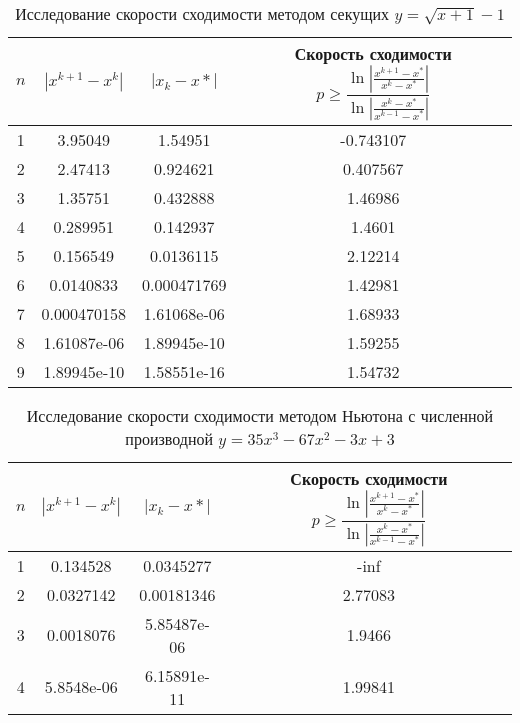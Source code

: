 \documentclass{article}
\begin{document}
    \begin{table}[H]
        \centering
        \caption{Исследование скорости сходимости методом секущих \mbox{$y = \sqrt{x+1} - 1$}}
        \begin{tabular}{|c|c|c|c|}
            \hline
            $n$ & $|x^{k+1} - x^k|$ & $ |x_k - x*|$ & Скорость сходимости $p \geqslant \dfrac{\ln | \frac{x^{k+1}-x^*}{x^k - x^*} |}{\ln |\frac{x^k -x^*}{x^{k-1} - x^*}|}$ \\
            \hline 
            1 & 3.95049 & 1.54951 & -0.743107 \\ \hline
            2 & 2.47413 & 0.924621 & 0.407567 \\ \hline
            3 & 1.35751 & 0.432888 & 1.46986 \\ \hline
            4 & 0.289951 & 0.142937 & 1.4601 \\ \hline
            5 & 0.156549 & 0.0136115 & 2.12214 \\ \hline
            6 & 0.0140833 & 0.000471769 & 1.42981 \\ \hline
            7 & 0.000470158 & 1.61068e-06 & 1.68933 \\ \hline
            8 & 1.61087e-06 & 1.89945e-10 & 1.59255 \\ \hline
            9 & 1.89945e-10 & 1.58551e-16 & 1.54732 \\ \hline
        \end{tabular}
    \end{table}
    \begin{table}[H]
        \centering
        \caption{Исследование скорости сходимости методом Ньютона с численной производной \mbox{$y = 35 x^3 - 67 x^2 -3x+3$}}
        \begin{tabular}{|c|c|c|c|}
            \hline
            $n$ & $|x^{k+1} - x^k|$ & $ |x_k - x*|$ & Скорость сходимости $p \geqslant \dfrac{\ln | \frac{x^{k+1}-x^*}{x^k - x^*} |}{\ln |\frac{x^k -x^*}{x^{k-1} - x^*}|}$ \\
            \hline 
            1 & 0.134528 & 0.0345277 & -inf \\ \hline
            2 & 0.0327142 & 0.00181346 & 2.77083 \\ \hline
            3 & 0.0018076 & 5.85487e-06 & 1.9466 \\ \hline
            4 & 5.8548e-06 & 6.15891e-11 & 1.99841 \\ \hline
        \end{tabular}
    \end{table}
\end{document}
